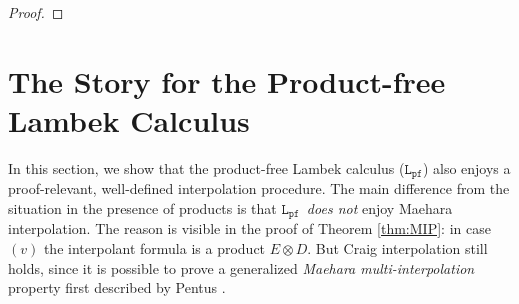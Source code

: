 \documentclass[a4paper,UKenglish,cleveref,autoref,thm-restate, anonymous]{lipics-v2021}
\newcommand{\ot}{\otimes}
\newcommand{\Rarr}{\Rightarrow}
\newcommand{\mf}[1]{\mathsf{#1}}
\renewcommand{\L}{$\mathtt{L}$}
\newcommand{\LPfree}{$\mathtt{L_{pf}}$}
\newcommand{\ax}{\mathsf{ax}}
\newcommand{\tl}{{\otimes}\mathsf{L}}
\newcommand{\tr}{{\otimes}\mathsf{R}}
\newcommand{\Rl}{{\Rarr}\mathsf{L}}
\newcommand{\Rr}{{\Rarr}\mathsf{R}}
\newcommand{\cut}{\mf{cut}}
\begin{document}
\begin{proof}
\end{proof}


\section{The Story for the Product-free Lambek Calculus}
In this section, we show that the product-free Lambek calculus (\LPfree) also enjoys a proof-relevant, well-defined interpolation procedure.
The main difference from the situation in the presence of products is that \LPfree\ \emph{does not} enjoy Maehara interpolation.
The reason is visible in the proof of Theorem \ref{thm:MIP}: in case $(v)$ the interpolant formula is a product $E \ot D$.
But Craig interpolation still holds, since it is possible to prove a generalized \emph{Maehara multi-interpolation} property first described by Pentus \cite{Pentus1997}. 
\end{document}
